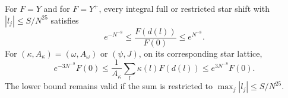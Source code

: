 \begin{lemma}\label{lem:shift-average}
For \(F=Y\) and for \(F=Y^+\), every integral full or restricted
star shift with \(|l_j|\le S/N^{25}\) satisfies
\begin{equation}\label{eq:small-shift-ratio}
 e^{-N^{-8}}\le \frac{F(d(l))}{F(0)}\le e^{N^{-8}}.
\end{equation}
For \((\kappa,A_\kappa)=(\omega,A_\omega)\) or \((\psi,J)\),
on its corresponding star lattice,
\begin{equation}\label{eq:average-comparison}
 e^{-3N^{-8}}F(0)
 \le \frac{1}{A_\kappa}\sum_l\kappa(l)F(d(l))
 \le e^{3N^{-8}}F(0).
\end{equation}
The lower bound remains valid if the sum is restricted to
\(\max_j|l_j|\le S/N^{25}\).
\end{lemma}

